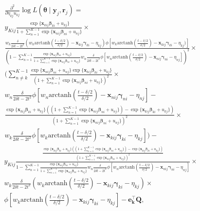 \documentclass[12pt, %
               openright, %
               oneside, %
               a4paper, %
               chapter=TITLE, %
               section=TITLE, %
               brazil,
               english %
]{abntex2}
\begin{document}
\begin{apendicesenv}
\begin{align*}
  &\frac{\partial^{2}}{\partial \eta_{kj} u_{kj}}
    \log L(\bm{\theta}\mid\bm{y}_{j}, \bm{r}_{j}) =\\
  &y_{Kij}
    \frac{\exp\{\bm{x}_{kij}\bm{\beta}_{ki} + u_{kj}\}}{1 +
    \sum_{n = 1}^{K-1}\exp\{\bm{x}_{nij}\bm{\beta}_{ni} + u_{nj}\}}\times\\
  &\frac{
    w_{k}\frac{\delta}{2\delta t - 2t^{2}}
    (w_{k}\text{arctanh}\left(\frac{t-\delta/2}{\delta/2}\right)
    - \bm{x}_{kij}\bm{\gamma}_{ki} - \eta_{kj})
    \phi[w_{k}\text{arctanh}\left(\frac{t-\delta/2}{\delta/2}\right)
    - \bm{x}_{kij}\bm{\gamma}_{ki} - \eta_{kj})]}{
    \left(1 -
    \sum_{n = 1}^{K-1}\frac{\exp\{\bm{x}_{nij}\bm{\beta}_{ni} + u_{nj}\}}{
    1 +
    \sum_{n = 1}^{K-1}\exp\{\bm{x}_{nij}\bm{\beta}_{ni} + u_{nj}\}}
    w_{n}\frac{\delta}{2\delta t - 2t^{2}}
    \phi[w_{n}\text{arctanh}\left(\frac{t-\delta/2}{\delta/2}\right)
    - \bm{x}_{nij}\bm{\gamma}_{ni} - \eta_{nj}]\right)^{2}}\times\\
  &\Bigg(
    \sum_{n \neq k}^{K-1}
    \frac{
    \exp\{\bm{x}_{nij}\bm{\beta}_{ni} + u_{nj}\}
    \exp\{\bm{x}_{kij}\bm{\beta}_{ki} + u_{kj}\}}{
    \left(1 +
    \sum_{n = 1}^{K-1}\exp\{\bm{x}_{nij}\bm{\beta}_{ni} + u_{nj}\}
    \right)^{2}}\times\\
  &w_{n}\frac{\delta}{2\delta t - 2t^{2}}
    \phi[w_{n}\text{arctanh}\left(\frac{t-\delta/2}{\delta/2}\right)
    - \bm{x}_{nij}\bm{\gamma}_{ni} - \eta_{nj}] -\\
  &\frac{\exp\{\bm{x}_{kij}\bm{\beta}_{ki} + u_{kj}\}
    \left(
    \left(1 +
    \sum_{n = 1}^{K-1}\exp\{\bm{x}_{nij}\bm{\beta}_{ni} + u_{nj}\}
    \right) - \exp\{\bm{x}_{kij} \bm{\beta}_{ki} + u_{kj}\}
    \right)}{
    \left(1 +
    \sum_{n = 1}^{K-1}\exp\{\bm{x}_{nij}\bm{\beta}_{ni} + u_{nj}\}
    \right)^{2}}\times\\
  &w_{k}\frac{\delta}{2\delta t - 2t^{2}}
    \phi[w_{k}\text{arctanh}\left(\frac{t-\delta/2}{\delta/2}\right)
    - \bm{x}_{kij}\bm{\gamma}_{ki} - \eta_{kj}]\Bigg) -
\end{align*}
\begin{align*}
  &y_{Kij}
    \frac{
    \frac{\exp\{\bm{x}_{kij}\bm{\beta}_{ki} + u_{kj}\}
    \left(
    \left(1 +
    \sum_{n = 1}^{K-1}\exp\{\bm{x}_{nij}\bm{\beta}_{ni} + u_{nj}\}
    \right) - \exp\{\bm{x}_{kij} \bm{\beta}_{ki} + u_{kj}\}
    \right)}{
    \left(1 +
    \sum_{n = 1}^{K-1}\exp\{\bm{x}_{nij}\bm{\beta}_{ni} + u_{nj}\}
    \right)^{2}}}{1 -
    \sum_{n = 1}^{K-1}\frac{\exp\{\bm{x}_{nij}\bm{\beta}_{ni} + u_{nj}\}}{
    1 + \sum_{n = 1}^{K-1}\exp\{\bm{x}_{nij}\bm{\beta}_{ni} + u_{nj}\}}
    w_{n}\frac{\delta}{2\delta t - 2t^{2}}
    \phi[w_{n}\text{arctanh}\left(\frac{t-\delta/2}{\delta/2}\right)
    - \bm{x}_{nij}\bm{\gamma}_{ni} - \eta_{nj}]}\times\\
  &w_{k}\frac{\delta}{2\delta t - 2t^{2}}
    (w_{k}\text{arctanh}\left(\frac{t-\delta/2}{\delta/2}\right)
    - \bm{x}_{kij}\bm{\gamma}_{ki} - \eta_{kj})\times\\
  &\phi[w_{k}\text{arctanh}\left(\frac{t-\delta/2}{\delta/2}\right)
    - \bm{x}_{kij}\bm{\gamma}_{ki} - \eta_{kj}] - \bm{e_{k}^{\top}Q},
\end{align*}


\end{apendicesenv}
\end{document}
